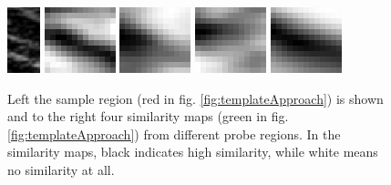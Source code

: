\documentclass[10pt,twocolumn,letterpaper]{article}
\begin{document}
\begin{figure}
	\begin{center}		
		\includegraphics[width=0.09\linewidth]{img/sample}
		\hspace{0.05\linewidth}
		\includegraphics[width=0.2\linewidth]{img/diff1}
		\includegraphics[width=0.2\linewidth]{img/diff2}
		\includegraphics[width=0.2\linewidth]{img/diff3}
		\includegraphics[width=0.2\linewidth]{img/diff4}
	\end{center}
	\caption{Left the sample region (red in fig. \ref{fig:templateApproach}) is shown and to the right four similarity maps (green in fig. \ref{fig:templateApproach}) from different probe regions. In the similarity maps, black indicates high similarity, while white means no similarity at all. }
	\label{fig:sampleAndSimScores}
\end{figure}
\end{document}
